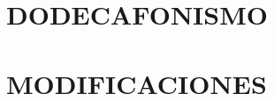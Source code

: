\documentclass[twoside]{book}
\begin{document}
	
    
    
	
	\pagestyle{fancy}
	
	
    \part{DODECAFONISMO}
    
	
    
    
    
    \part{MODIFICACIONES}
	
	
    
    
    
	\cleardoublepage
    
	

	\cleardoublepage
    
\end{document}
